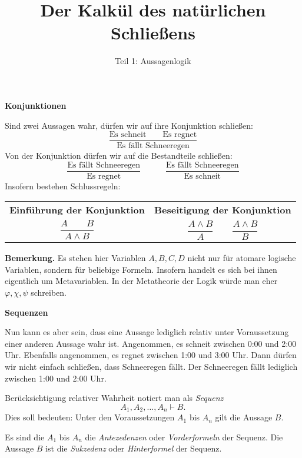 \documentclass[8pt]{beamer}
\title{Der Kalkül des natürlichen Schließens}
\subtitle{Teil 1: Aussagenlogik}
\date{}
\newcommand{\strong}[1]{\textsf{\textbf{#1}}}
\newcommand{\centerheadline}[1]{%
  \begin{center}\strong{#1}\end{center}}
\newcommand{\parspace}{\vspace{0.8em}}
\begin{document}
\begin{frame}
\maketitle
\end{frame}

\begin{frame}
\centerheadline{Konjunktionen}
\end{frame}

\begin{frame}[t]
\vspace{2em}
Sind zwei Aussagen wahr, dürfen wir auf ihre Konjunktion schließen:
\[\dfrac{\text{Es schneit}\qquad\text{Es regnet}}{
  \text{Es fällt Schneeregen}}\]\pause
Von der Konjunktion dürfen wir auf die Bestandteile schließen:
\[\dfrac{\text{Es fällt Schneeregen}}{\text{Es regnet}}\qquad\quad
  \dfrac{\text{Es fällt Schneeregen}}{\text{Es schneit}}\]\pause
Insofern bestehen Schlussregeln:
\begin{center}
\begin{tabular}{c@{\qquad\quad}c}
\strong{\small Einführung der Konjunktion}
& \strong{\small Beseitigung der Konjunktion}\\[6pt]
$\dfrac{A\qquad B}{A\land B}$
& $\dfrac{A\land B}{A}\qquad\dfrac{A\land B}{B}$\\
\end{tabular}
\end{center}\pause

\parspace
\begin{footnotesize}
\strong{Bemerkung.} Es stehen hier Variablen $A,B,C,D$ nicht nur
für atomare logische Variablen, sondern für beliebige Formeln.
Insofern handelt es sich bei ihnen eigentlich um Metavariablen.
In der Metatheorie der Logik würde man eher $\varphi,\chi,\psi$
schreiben.
\end{footnotesize}
\end{frame}

\begin{frame}
\centerheadline{Sequenzen}
\end{frame}

\begin{frame}
Nun kann es aber sein, dass eine Aussage lediglich relativ unter
Voraussetzung einer anderen Aussage wahr ist. Angenommen, es schneit
zwischen 0:00 und 2:00 Uhr. Ebenfalls angenommen, es regnet zwischen
1:00 und 3:00 Uhr. Dann dürfen wir nicht einfach schließen, dass
Schneeregen fällt. Der Schneeregen fällt lediglich zwischen
1:00 und 2:00 Uhr.\pause

\parspace
Berücksichtigung relativer Wahrheit notiert man als \emph{Sequenz}
\[A_1,A_2,\ldots,A_n\vdash B.\]
Dies soll bedeuten: Unter den Voraussetzungen $A_1$ bis $A_n$
gilt die Aussage $B$.\pause

\parspace
Es sind die $A_1$ bis $A_n$ die \emph{Antezedenzen} oder
\emph{Vorderformeln} der Sequenz. Die Aussage $B$ ist die
\emph{Sukzedenz} oder \emph{Hinterformel} der Sequenz.
\end{frame}
\end{document}
